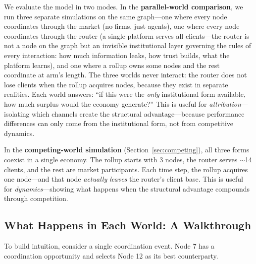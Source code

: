 \documentclass[12pt]{article}
\theoremstyle{definition}
\begin{document}
We evaluate the model in two modes. In the \textbf{parallel-world comparison}, we run three separate simulations on the same graph---one where every node coordinates through the market (no firms, just agents), one where every node coordinates through the router (a single platform serves all clients---the router is not a node on the graph but an invisible institutional layer governing the rules of every interaction: how much information leaks, how trust builds, what the platform learns), and one where a rollup owns some nodes and the rest coordinate at arm's length. The three worlds never interact: the router does not lose clients when the rollup acquires nodes, because they exist in separate realities. Each world answers: ``if this were the \textit{only} institutional form available, how much surplus would the economy generate?'' This is useful for \textit{attribution}---isolating which channels create the structural advantage---because performance differences can only come from the institutional form, not from competitive dynamics.

In the \textbf{competing-world simulation} (Section~\ref{sec:competing}), all three forms coexist in a single economy. The rollup starts with 3 nodes, the router serves $\sim$14 clients, and the rest are market participants. Each time step, the rollup acquires one node---and that node \textit{actually leaves} the router's client base. This is useful for \textit{dynamics}---showing what happens when the structural advantage compounds through competition.

\subsection{What Happens in Each World: A Walkthrough}

To build intuition, consider a single coordination event. Node 7 has a coordination opportunity and selects Node 12 as its best counterparty.
\end{document}
